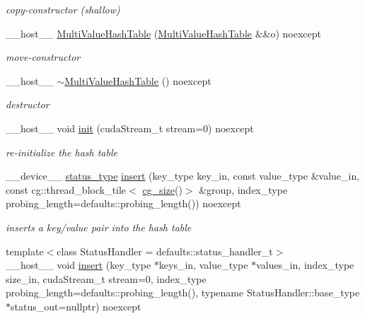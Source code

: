 \begin{DoxyCompactItemize}
\begin{DoxyCompactList}\small\item\em copy-\/constructor (shallow) \end{DoxyCompactList}\item 
\+\_\+\+\_\+host\+\_\+\+\_\+ \hyperlink{classwarpcore_1_1MultiValueHashTable_a4f6a0139f63184da8301b48a3c93b43a}{Multi\+Value\+Hash\+Table} (\hyperlink{classwarpcore_1_1MultiValueHashTable}{Multi\+Value\+Hash\+Table} \&\&o) noexcept
\begin{DoxyCompactList}\small\item\em move-\/constructor \end{DoxyCompactList}\item 
\mbox{\label{classwarpcore_1_1MultiValueHashTable_a28e32b5bb69c488a419c025d3643c584}} 
\+\_\+\+\_\+host\+\_\+\+\_\+ \hyperlink{classwarpcore_1_1MultiValueHashTable_a28e32b5bb69c488a419c025d3643c584}{$\sim$\+Multi\+Value\+Hash\+Table} () noexcept
\begin{DoxyCompactList}\small\item\em destructor \end{DoxyCompactList}\item 
\+\_\+\+\_\+host\+\_\+\+\_\+ void \hyperlink{classwarpcore_1_1MultiValueHashTable_a8a13707d263729d8ab1ed146ce487309}{init} (cuda\+Stream\+\_\+t stream=0) noexcept
\begin{DoxyCompactList}\small\item\em re-\/initialize the hash table \end{DoxyCompactList}\item 
\+\_\+\+\_\+device\+\_\+\+\_\+ \hyperlink{classwarpcore_1_1Status}{status\+\_\+type} \hyperlink{classwarpcore_1_1MultiValueHashTable_a7f579f9cd29c3b210bd8b6b02af8fcb9}{insert} (key\+\_\+type key\+\_\+in, const value\+\_\+type \&value\+\_\+in, const cg\+::thread\+\_\+block\+\_\+tile$<$ \hyperlink{classwarpcore_1_1MultiValueHashTable_a2191f42810234e459bc4ef6e491ec929}{cg\+\_\+size}()$>$ \&group, index\+\_\+type probing\+\_\+length=defaults\+::probing\+\_\+length()) noexcept
\begin{DoxyCompactList}\small\item\em inserts a key/value pair into the hash table \end{DoxyCompactList}\item 
{\footnotesize template$<$class Status\+Handler  = defaults\+::status\+\_\+handler\+\_\+t$>$ }\\\+\_\+\+\_\+host\+\_\+\+\_\+ void \hyperlink{classwarpcore_1_1MultiValueHashTable_afad6f1622ae85e9a54ffae11be8a920c}{insert} (key\+\_\+type $\ast$keys\+\_\+in, value\+\_\+type $\ast$values\+\_\+in, index\+\_\+type size\+\_\+in, cuda\+Stream\+\_\+t stream=0, index\+\_\+type probing\+\_\+length=defaults\+::probing\+\_\+length(), typename Status\+Handler\+::base\+\_\+type $\ast$status\+\_\+out=nullptr) noexcept

\end{DoxyCompactItemize}
